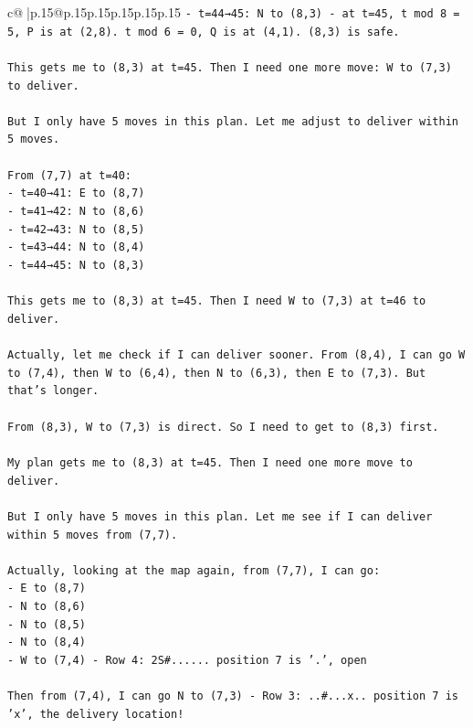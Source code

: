 \documentclass{article}
\begin{document}
{\begin{supertabular}{c@{$\;$}|p{.15\linewidth}@{}p{.15\linewidth}p{.15\linewidth}p{.15\linewidth}p{.15\linewidth}p{.15\linewidth}}
{{{\texttt{{-} t=44→45: N to (8,3) {-} at t=45, t mod 8 = 5, P is at (2,8). t mod 6 = 0, Q is at (4,1). (8,3) is safe.} \\
\\ 
\texttt{This gets me to (8,3) at t=45. Then I need one more move: W to (7,3) to deliver.} \\
\\ 
\texttt{But I only have 5 moves in this plan. Let me adjust to deliver within 5 moves.} \\
\\ 
\texttt{From (7,7) at t=40:} \\
\texttt{{-} t=40→41: E to (8,7)} \\
\texttt{{-} t=41→42: N to (8,6)} \\
\texttt{{-} t=42→43: N to (8,5)} \\
\texttt{{-} t=43→44: N to (8,4)} \\
\texttt{{-} t=44→45: N to (8,3)} \\
\\ 
\texttt{This gets me to (8,3) at t=45. Then I need W to (7,3) at t=46 to deliver.} \\
\\ 
\texttt{Actually, let me check if I can deliver sooner. From (8,4), I can go W to (7,4), then W to (6,4), then N to (6,3), then E to (7,3). But that's longer.} \\
\\ 
\texttt{From (8,3), W to (7,3) is direct. So I need to get to (8,3) first.} \\
\\ 
\texttt{My plan gets me to (8,3) at t=45. Then I need one more move to deliver.} \\
\\ 
\texttt{But I only have 5 moves in this plan. Let me see if I can deliver within 5 moves from (7,7).} \\
\\ 
\texttt{Actually, looking at the map again, from (7,7), I can go:} \\
\texttt{{-} E to (8,7)} \\
\texttt{{-} N to (8,6)} \\
\texttt{{-} N to (8,5)} \\
\texttt{{-} N to (8,4)} \\
\texttt{{-} W to (7,4) {-} Row 4: 2S\#...... position 7 is '.', open} \\
\\ 
\texttt{Then from (7,4), I can go N to (7,3) {-} Row 3: ..\#...x.. position 7 is 'x', the delivery location!} \\
}}}
\end{supertabular}}
\end{document}
